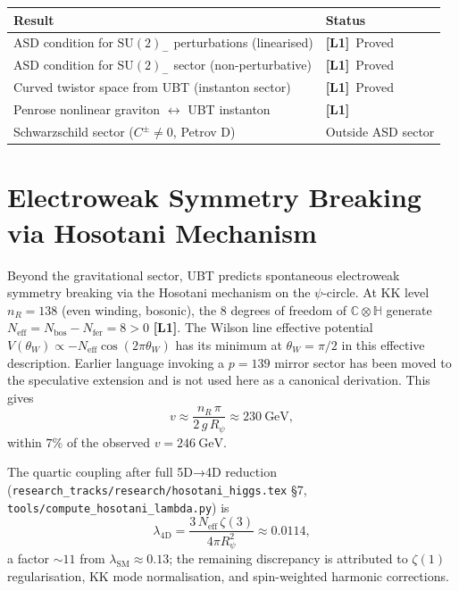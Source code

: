 \documentclass[11pt,a4paper]{article}
\theoremstyle{definition}
\theoremstyle{remark}
\newcommand{\Lone}{\textbf{[L1]}}
\begin{document}
\begin{center}
\begin{tabular}{|l|l|}
\hline
\textbf{Result} & \textbf{Status} \\
\hline
ASD condition for $\mathrm{SU}(2)_-$ perturbations (linearised) & \Lone\ Proved \\
ASD condition for $\mathrm{SU}(2)_-$ sector (non-perturbative) & \Lone\ Proved \\
Curved twistor space from UBT (instanton sector) & \Lone\ Proved \\
Penrose nonlinear graviton $\leftrightarrow$ UBT instanton & \Lone\ \\
Schwarzschild sector ($C^\pm \neq 0$, Petrov D) & Outside ASD sector \\
\hline
\end{tabular}
\end{center}

\section{Electroweak Symmetry Breaking via Hosotani Mechanism}
\label{sec:higgs}

Beyond the gravitational sector, UBT predicts spontaneous electroweak
symmetry breaking via the Hosotani mechanism on the $\psi$-circle.
At KK level $n_R = 138$ (even winding, bosonic), the 8 degrees of
freedom of $\mathbb{C}\otimes\mathbb{H}$ generate
$N_{\mathrm{eff}} = N_{\mathrm{bos}} - N_{\mathrm{fer}} = 8 > 0$ \Lone.
The Wilson line effective potential
$V(\theta_W) \propto -N_{\mathrm{eff}} \cos(2\pi\theta_W)$
has its minimum at $\theta_W = \pi/2$ in this effective description.
Earlier language invoking a $p=139$ mirror sector has been moved to the
speculative extension and is not used here as a canonical derivation.  This gives
\begin{equation}
  v \approx \frac{n_R\,\pi}{2\,g\,R_\psi} \approx 230~\text{GeV},
\end{equation}
within $7\%$ of the observed $v = 246~\text{GeV}$.

The quartic coupling after full 5D→4D reduction
(\texttt{research\_tracks/research/hosotani\_higgs.tex} §7,
\texttt{tools/compute\_hosotani\_lambda.py}) is
\begin{equation}
  \lambda_{\text{4D}}
  = \frac{3\,N_{\mathrm{eff}}\,\zeta(3)}{4\pi R_\psi^2}
  \approx 0.0114,
\end{equation}
a factor $\sim 11$ from $\lambda_{\text{SM}} \approx 0.13$; the
remaining discrepancy is attributed to $\zeta(1)$ regularisation,
KK mode normalisation, and spin-weighted harmonic corrections.
\end{document}
